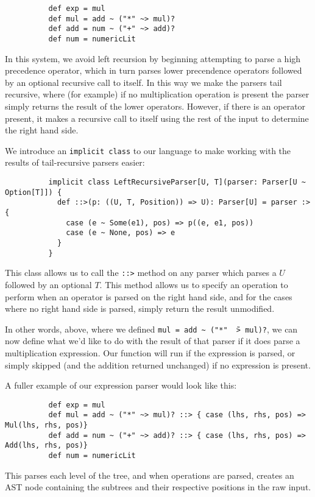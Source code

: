 \documentclass[british, twoside]{bhamthesis}
\theoremstyle{definition}
\begin{document}
        \begin{lstlisting}
          def exp = mul
          def mul = add ~ ("*" ~> mul)?
          def add = num ~ ("+" ~> add)?
          def num = numericLit
        \end{lstlisting}

        In this system, we avoid left recursion by beginning attempting to parse a high precedence operator, which in turn parses lower precendence operators followed by an optional recursive call to itself. In this way we make the parsers tail recursive, where (for example) if no multiplication operation is present the parser simply returns the result of the lower operators. However, if there is an operator present, it makes a recursive call to itself using the rest of the input to determine the right hand side.

        We introduce an \texttt{implicit class} to our language to make working with the results of tail-recursive parsers easier:
        \begin{lstlisting}
          implicit class LeftRecursiveParser[U, T](parser: Parser[U ~ Option[T]]) {
            def ::>(p: ((U, T, Position)) => U): Parser[U] = parser :> {
              case (e ~ Some(e1), pos) => p((e, e1, pos))
              case (e ~ None, pos) => e
            }
          }
        \end{lstlisting}

        This class allows us to call the \texttt{::>} method on any parser which parses a $U$ followed by an optional $T$. This method allows us to specify an operation to perform when an operator is parsed on the right hand side, and for the cases where no right hand side is parsed, simply return the result unmodified.

        In other words, above, where we defined \texttt{mul = add \~~("*" \~\ > mul)?}, we can now define what we'd like to do with the result of that parser if it does parse a multiplication expression. Our function will run if the expression is parsed, or simply skipped (and the addition returned unchanged) if no expression is present.

        A fuller example of our expression parser would look like this:
        \begin{lstlisting}
          def exp = mul
          def mul = add ~ ("*" ~> mul)? ::> { case (lhs, rhs, pos) => Mul(lhs, rhs, pos)}
          def add = num ~ ("+" ~> add)? ::> { case (lhs, rhs, pos) => Add(lhs, rhs, pos)}
          def num = numericLit
        \end{lstlisting}
        This parses each level of the tree, and when operations are parsed, creates an AST node containing the subtrees and their respective positions in the raw input.
\end{document}
